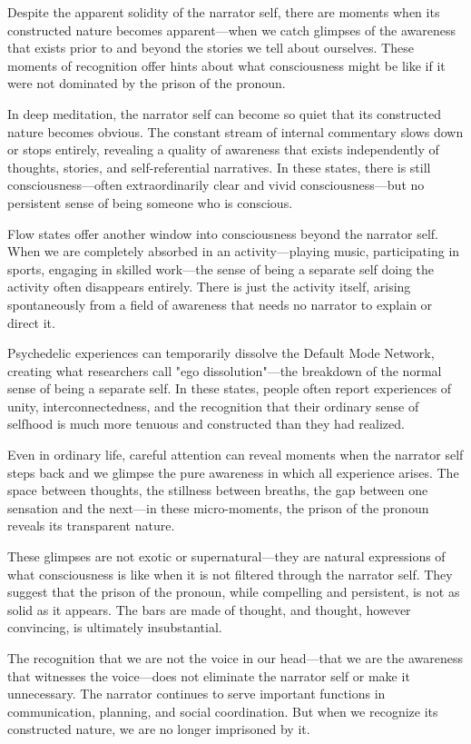 Despite the apparent solidity of the narrator self, there are moments when its constructed nature becomes apparent—when we catch glimpses of the awareness that exists prior to and beyond the stories we tell about ourselves. These moments of recognition offer hints about what consciousness might be like if it were not dominated by the prison of the pronoun.

In deep meditation, the narrator self can become so quiet that its constructed nature becomes obvious. The constant stream of internal commentary slows down or stops entirely, revealing a quality of awareness that exists independently of thoughts, stories, and self-referential narratives. In these states, there is still consciousness—often extraordinarily clear and vivid consciousness—but no persistent sense of being someone who is conscious.

Flow states offer another window into consciousness beyond the narrator self. When we are completely absorbed in an activity—playing music, participating in sports, engaging in skilled work—the sense of being a separate self doing the activity often disappears entirely. There is just the activity itself, arising spontaneously from a field of awareness that needs no narrator to explain or direct it.

Psychedelic experiences can temporarily dissolve the Default Mode Network, creating what researchers call "ego dissolution"—the breakdown of the normal sense of being a separate self. In these states, people often report experiences of unity, interconnectedness, and the recognition that their ordinary sense of selfhood is much more tenuous and constructed than they had realized.

Even in ordinary life, careful attention can reveal moments when the narrator self steps back and we glimpse the pure awareness in which all experience arises. The space between thoughts, the stillness between breaths, the gap between one sensation and the next—in these micro-moments, the prison of the pronoun reveals its transparent nature.

These glimpses are not exotic or supernatural—they are natural expressions of what consciousness is like when it is not filtered through the narrator self. They suggest that the prison of the pronoun, while compelling and persistent, is not as solid as it appears. The bars are made of thought, and thought, however convincing, is ultimately insubstantial.

The recognition that we are not the voice in our head—that we are the awareness that witnesses the voice—does not eliminate the narrator self or make it unnecessary. The narrator continues to serve important functions in communication, planning, and social coordination. But when we recognize its constructed nature, we are no longer imprisoned by it.

